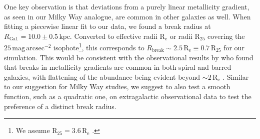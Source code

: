 \documentclass[twocolumn,apj,numberedappendix,appendixfloats]{openjournal}
\begin{document}
\begin{CJK*}{UTF8}{gbsn}
One key observation is that deviations from a purely linear metallicity gradient, as seen in our Milky Way analogue, are common in other galaxies as well. When fitting a piecewise linear fit to our data, we found a break radius at $R_\mathrm{Gal.} = 10.0 \pm 0.5\,\mathrm{kpc}$. Converted to effective radii $\mathrm{R_e}$ or radii $\mathrm{R_{25}}$ covering the $25\,\mathrm{mag\,arcsec^{-2}}$ isophote\footnote{We assume $\mathrm{R_{25}} = 3.6\,\mathrm{R_e}$ \citep{Williams2009, Chen2023}.}, this corresponds to $R_\mathrm{break} \sim 2.5\,\mathrm{R_e} \equiv 0.7\,\mathrm{R_{25}}$ for our simulation. This would be consistent with the observational results by \citet{Sanchez2014} who found that breaks in metallicity gradients are common in both spiral and barred galaxies, with flattening of the abundance being evident beyond $\sim 2\,\mathrm{R_e}$ \citep[compare also to][]{Belfiore2017}. Similar to our suggestion for Milky Way studies, we suggest to also test a smooth function, such as a quadratic one, on extragalactic observational data \citep[e.g.][]{Bresolin2012, Chen2023} to test the preference of a distinct break radius.


\end{CJK*}
\end{document}
